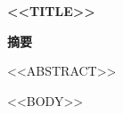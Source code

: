 \documentclass[UTF8,a4paper,zihao=-4,fontset=fandol]{ctexart}
\begin{document}
\begin{center}
  {\bfseries <<TITLE>>}
\end{center}

\begin{center}
  {\bfseries 摘\quad 要}
\end{center}

<<ABSTRACT>>

\newpage

<<BODY>>
\end{document}

